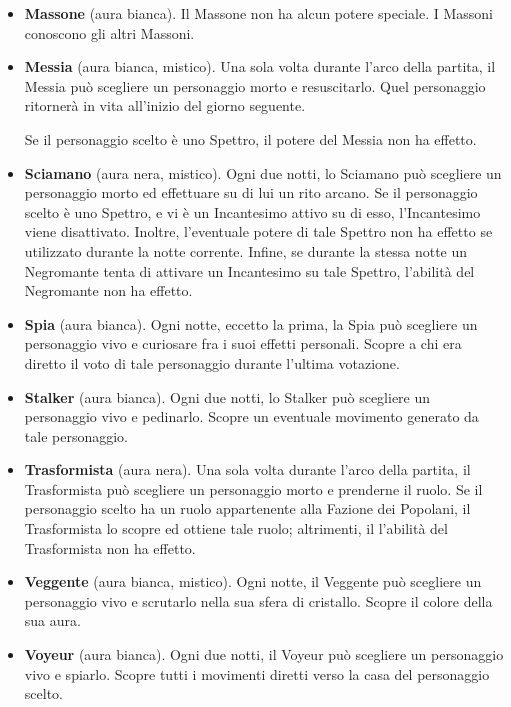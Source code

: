 \documentclass[a4paper,10pt]{article}
\begin{document}
\begin{itemize}
	\item {\bf Massone} (aura bianca). Il Massone non ha alcun potere speciale. I Massoni conoscono gli altri Massoni.
 
	\item {\bf Messia} (aura bianca, mistico). Una sola volta durante l'arco della partita, il Messia può scegliere un personaggio morto e resuscitarlo. Quel personaggio ritornerà in vita all'inizio del giorno seguente.
 
	 Se il personaggio scelto è uno Spettro, il potere del Messia non ha effetto.

	\item{\bf Sciamano} (aura nera, mistico). Ogni due notti, lo Sciamano può scegliere un personaggio morto ed effettuare su di lui un rito arcano. Se il personaggio scelto è uno Spettro, e vi è un Incantesimo attivo su di esso, l'Incantesimo viene disattivato. Inoltre, l'eventuale potere di tale Spettro non ha effetto se utilizzato durante la notte corrente. Infine, se durante la stessa notte un Negromante tenta di attivare un Incantesimo su tale Spettro, l'abilità del Negromante non ha effetto.
	
	\item {\bf Spia} (aura bianca). Ogni notte, eccetto la prima, la Spia può scegliere un personaggio vivo e curiosare fra i suoi effetti personali. Scopre a chi era diretto il voto di tale personaggio durante l'ultima votazione.

	\item {\bf Stalker} (aura bianca). Ogni due notti, lo Stalker può scegliere un personaggio vivo e pedinarlo. Scopre un eventuale movimento generato da tale personaggio.
	
	\item {\bf Trasformista} (aura nera). Una sola volta durante l'arco della partita, il Trasformista può scegliere un personaggio morto e prenderne il ruolo. Se il personaggio scelto ha un ruolo appartenente alla Fazione dei Popolani, il Trasformista lo scopre ed ottiene tale ruolo; altrimenti, il l'abilità del Trasformista non ha effetto.
	
	\item {\bf Veggente} (aura bianca, mistico). Ogni notte, il Veggente può scegliere un personaggio vivo e scrutarlo nella sua sfera di cristallo. Scopre il colore della sua aura.

	\item {\bf Voyeur} (aura bianca). Ogni due notti, il Voyeur può scegliere un personaggio vivo e spiarlo. Scopre tutti i movimenti diretti verso la casa del personaggio scelto.
	
\end{itemize}
\end{document}
